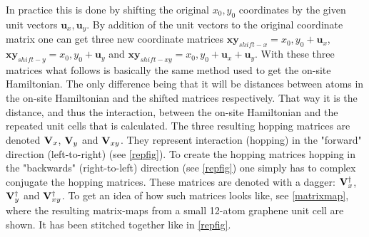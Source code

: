 In practice this is done by shifting the original \(x_0,y_0\) coordinates by the given unit vectors \(\mathbf{u}_x,\mathbf{u}_y\). By addition of the unit vectors to the original coordinate matrix one can get three new coordinate matrices \(\mathbf{xy}_{shift-x}=x_0,y_0 + \mathbf{u}_x\), \(\mathbf{xy}_{shift-y}=x_0,y_0 + \mathbf{u}_y\) and \(\mathbf{xy}_{shift-xy}=x_0,y_0 + \mathbf{u}_x+\mathbf{u}_y\). With these three matrices what follows is basically the same method used to get the on-site Hamiltonian. The only difference being that it will be distances between atoms in the on-site Hamiltonian and the shifted matrices respectively. That way it is the distance, and thus the interaction, between the on-site Hamiltonian and the repeated unit cells that is calculated. The three resulting hopping matrices are denoted \(\vb{V}_{x}\), \(\vb{V}_{y}\) and \(\vb{V}_{xy}\). They represent interaction (hopping) in the "forward" direction (left-to-right) (see \cref{repfig}). To create the hopping matrices hopping in the "backwards" (right-to-left) direction (see \cref{repfig}) one simply has to complex conjugate the hopping matrices. These matrices are denoted with a dagger: \(\vb{V}_{x}^{\dagger}\), \(\vb{V}_{y}^{\dagger}\) and \(\vb{V}_{xy}^{\dagger}\). To get an idea of how such matrices looks like, see \cref{matrixmap}, where the resulting matrix-maps from a small 12-atom graphene unit cell are shown. It has been stitched together like in \cref{repfig}.
